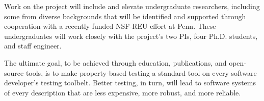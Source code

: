 Work on the project will include and elevate undergraduate
researchers, including some from diverse backgrounds that will be
identified and supported through cooperation with a recently funded NSF-REU effort
at Penn. These undergraduates will work closely with the project's two
PIs, four Ph.D.{} students, and staff engineer.

The ultimate goal, to be achieved through education, publications, and open-source
tools, is to make property-based testing a standard tool on every
software developer's testing toolbelt.  Better testing, in turn, will
lead to software systems of every description that are less expensive, more
robust, and more reliable.


